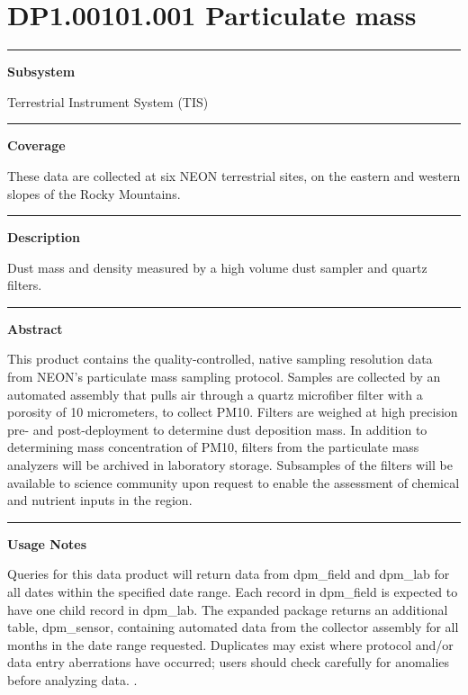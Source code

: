 \documentclass[]{article}
\begin{document}
\section{DP1.00101.001 Particulate
mass}\label{dp1.00101.001-particulate-mass}

\begin{center}\rule{0.5\linewidth}{\linethickness}\end{center}

\textbf{Subsystem}

Terrestrial Instrument System (TIS)

\begin{center}\rule{0.5\linewidth}{\linethickness}\end{center}

\textbf{Coverage}

These data are collected at six NEON terrestrial sites, on the eastern
and western slopes of the Rocky Mountains.

\begin{center}\rule{0.5\linewidth}{\linethickness}\end{center}

\textbf{Description}

Dust mass and density measured by a high volume dust sampler and quartz
filters.

\begin{center}\rule{0.5\linewidth}{\linethickness}\end{center}

\textbf{Abstract}

This product contains the quality-controlled, native sampling resolution
data from NEON's particulate mass sampling protocol. Samples are
collected by an automated assembly that pulls air through a quartz
microfiber filter with a porosity of 10 micrometers, to collect PM10.
Filters are weighed at high precision pre- and post-deployment to
determine dust deposition mass. In addition to determining mass
concentration of PM10, filters from the particulate mass analyzers will
be archived in laboratory storage. Subsamples of the filters will be
available to science community upon request to enable the assessment of
chemical and nutrient inputs in the region.

\begin{center}\rule{0.5\linewidth}{\linethickness}\end{center}

\textbf{Usage Notes}

Queries for this data product will return data from dpm\_field and
dpm\_lab for all dates within the specified date range. Each record in
dpm\_field is expected to have one child record in dpm\_lab. The
expanded package returns an additional table, dpm\_sensor, containing
automated data from the collector assembly for all months in the date
range requested. Duplicates may exist where protocol and/or data entry
aberrations have occurred; users should check carefully for anomalies
before analyzing data. \newpage
.
\end{document}
